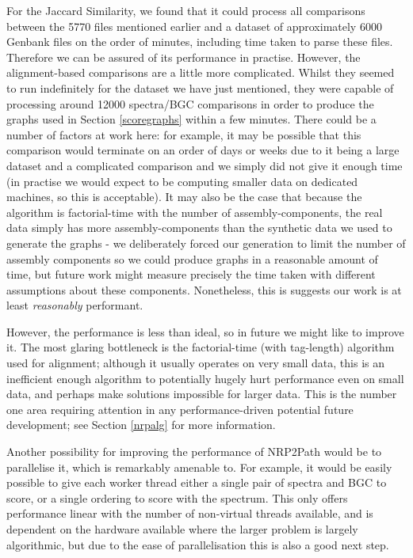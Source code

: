 \documentclass{l4proj}
\begin{document}
For the Jaccard Similarity, we found that it could process all comparisons between the 5770 files mentioned earlier and a dataset of approximately 6000 Genbank files on the order of minutes, including time taken to parse these files. Therefore we can be assured of its performance in practise. However, the alignment-based comparisons are a little more complicated. Whilst they seemed to run indefinitely for the dataset we have just mentioned, they were capable of processing around 12000 spectra/BGC comparisons in order to produce the graphs used in Section \ref{scoregraphs} within a few minutes. There could be a number of factors at work here: for example, it may be possible that this comparison would terminate on an order of days or weeks due to it being a large dataset and a complicated comparison and we simply did not give it enough time (in practise we would expect to be computing smaller data on dedicated machines, so this is acceptable). It may also be the case that because the algorithm is factorial-time with the number of assembly-components, the real data simply has more assembly-components than the synthetic data we used to generate the graphs - we deliberately forced our generation to limit the number of assembly components so we could produce graphs in a reasonable amount of time, but future work might measure precisely the time taken with different assumptions about these components. Nonetheless, this is suggests our work is at least \textit{reasonably} performant.

However, the performance is less than ideal, so in future we might like to improve it. The most glaring bottleneck is the factorial-time (with tag-length) algorithm used for alignment; although it usually operates on very small data, this is an inefficient enough algorithm to potentially hugely hurt performance even on small data, and perhaps make solutions impossible for larger data. This is the number one area requiring attention in any performance-driven potential future development; see Section \ref{nrpalg} for more information.

Another possibility for improving the performance of NRP2Path would be to parallelise it, which is remarkably amenable to. For example, it would be easily possible to give each worker thread either a single pair of spectra and BGC to score, or a single ordering to score with the spectrum. This only offers performance linear with the number of non-virtual threads available, and is dependent on the hardware available where the larger problem is largely algorithmic, but due to the ease of parallelisation this is also a good next step.
\end{document}
